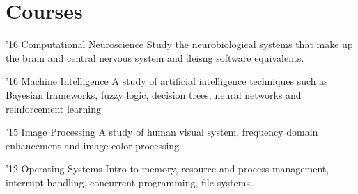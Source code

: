 \documentclass{tccv}
\begin{document}
\section{Courses}

\begin{yearlist}

\item{'16}
     {Computational Neuroscience}
     {Study the neurobiological systems that make up the brain and central nervous system and deisng software equivalents.}

\item{'16}
     {Machine Intelligence}
     {A study of artificial intelligence techniques such as Bayesian frameworks, fuzzy logic, decision trees, neural networks and reinforcement learning}

\item{'15}
     {Image Processing}
     {A study of human visual system, frequency domain enhancement and image color processing}
   \item{'12}
     {Operating Systems}
     {Intro to memory, resource and process management, interrupt handling, concurrent programming, file systems.}



\end{yearlist}


\end{document}
